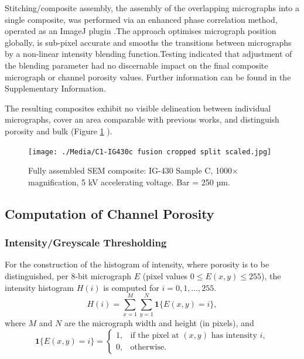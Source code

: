 \documentclass[review]{elsarticle}
\begin{document}
Stitching/composite assembly, the assembly of the overlapping micrographs into a
single composite, was performed via an enhanced phase correlation method,
operated as an ImageJ plugin \citep{ Preibisch2009}.The approach optimises
micrograph position globally, is sub-pixel accurate and smooths the transitions
between micrographs by a non-linear intensity blending function.Testing
indicated that adjustment of the blending parameter had no discernable impact on
the final composite micrograph or channel porosity values. Further information
can be found in the Supplementary Information.


The resulting composites exhibit no visible delineation between individual
micrographs, cover an area comparable with previous works, and distinguish
porosity and bulk (Figure \ref{fig:IG430C split scaled}
\citep{Huang2019,Kane2011a,huang2021statistical}). 

	\begin{figure}
		\centering
		\texttt{[image: ./Media/C1-IG430c fusion cropped split scaled.jpg]}
		\caption{Fully assembled SEM composite: IG-430 Sample C, 1000×  magnification,
     5 kV accelerating voltage. Bar = 250 µm.}
		\label{fig:IG430C split scaled}
	\end{figure} 

\subsection{Computation of Channel Porosity}
\subsubsection{Intensity/Greyscale Thresholding}

For the construction of the histogram of intensity, where porosity is to be
distinguished, per 8-bit micrograph \(E\) (pixel values \(0 \le E(x,y) \le 255\)),
the intensity histogram \(H(i)\) is computed for \(i=0,1,\dots,255\).
\[
H(i) = \sum_{x=1}^{M}\sum_{y=1}^{N} \mathbf{1}\{E(x,y)=i\},
\]
where \(M\) and \(N\) are the micrograph width and height (in pixels), and
\[
\mathbf{1}\{E(x,y)=i\} =
\begin{cases}
1, & \text{if the pixel at }(x,y)\text{ has intensity }i,\\
0, & \text{otherwise.}
\end{cases}
\]
\end{document}

